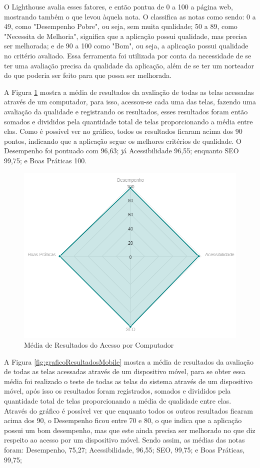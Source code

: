 O Lighthouse avalia esses fatores, e então pontua de 0 a 100 a página web, mostrando também o que levou àquela nota. O \cite{lighthouse} classifica as notas como sendo: 0 a 49, como "Desempenho Pobre", ou seja, sem muita qualidade; 50 a 89, como "Necessita de Melhoria", significa que a aplicação possui qualidade, mas precisa ser melhorada; e de 90 a 100 como "Bom", ou seja, a aplicação possui qualidade no critério avaliado. Essa ferramenta foi utilizada por conta da necessidade de se ter uma avaliação precisa da qualidade da aplicação, além de se ter um norteador do que poderia ser feito para que possa ser melhorada.

A Figura \ref{fig:graficoResultadosDesktop} mostra a média de resultados da avaliação de todas as telas acessadas através de um computador, para isso, acessou-se cada uma das telas, fazendo uma avaliação da qualidade e registrando os resultados, esses resultados foram então somados e divididos pela quantidade total de telas proporcionando a média entre elas. Como é possível ver no gráfico, todos os resultados ficaram acima dos 90 pontos, indicando que a aplicação segue os melhores critérios de qualidade. O Desempenho foi pontuado com 96,63; já Acessibilidade 96,55; enquanto SEO 99,75; e Boas Práticas 100.

\begin{figure}[H]
    \centering
    \includegraphics[width=12cm]{dados/figuras/Resultados/radar_desktop.png}
    \caption{Média de Resultados do Acesso por Computador}
    \label{fig:graficoResultadosDesktop}
\end{figure}

A Figura \ref{fig:graficoResultadosMobile} mostra a média de resultados da avaliação de todas as telas acessadas através de um dispositivo móvel, para se obter essa média foi realizado o teste de todas as telas do sistema através de um dispositivo móvel, após isso os resultados foram registrados, somados e divididos pela quantidade total de telas proporcionando a média de qualidade entre elas. Através do gráfico é possível ver que enquanto todos os outros resultados ficaram acima dos 90, o Desempenho ficou entre 70 e 80, o que indica que a aplicação possui um bom desempenho, mas que este ainda precisa ser melhorado no que diz respeito ao acesso por um dispositivo móvel. Sendo assim, as médias das notas foram: Desempenho, 75,27; Acessibilidade, 96,55; SEO, 99,75; e Boas Práticas, 99,75;

